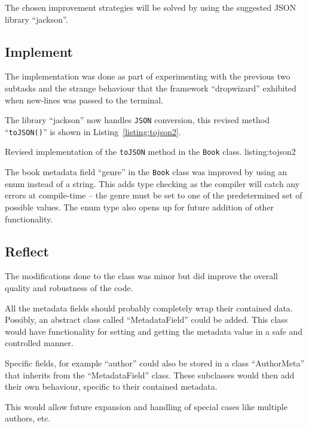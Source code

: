 The chosen improvement strategies will be solved by using the suggested JSON
library ``jackson''\cite{jackson-json}.

\subsection{Implement}\label{task-1c-implement}
The implementation was done as part of experimenting with the previous two
subtasks and the strange behaviour that the framework ``dropwizard'' exhibited
when new-lines was passed to the terminal.

The library ``jackson'' now handles \texttt{JSON} conversion,  this revised
method ``\texttt{toJSON()}'' is shown in Listing~\ref{listing:tojson2}.

           {Revised implementation of the \texttt{toJSON\(\)} method in the
            \texttt{Book} class.}
           {listing:tojson2}

The book metadata field ``genre'' in the \texttt{Book} class was improved by
using an enum instead of a string. This adds type checking as the compiler will
catch any errors at compile-time -- the genre must be set to one of the
predetermined set of possible values. The enum type also opens up for future
addition of other functionality.


\subsection{Reflect}\label{task-1c-reflect}
The modifications done to the class was minor but did improve the overall
quality and robustness of the code.

All the metadata fields should probably completely wrap their contained data.
Possibly, an abstract class called ``MetadataField'' could be added. This class
would have functionality for setting and getting the metadata value in a safe
and controlled manner.

Specific fields, for example ``author'' could also be stored in a class
``AuthorMeta'' that inherits from the ``MetadataField'' class. These subclasses
would then add their own behaviour, specific to their contained metadata.

This would allow future expansion and handling of special cases like multiple
authors, etc.
